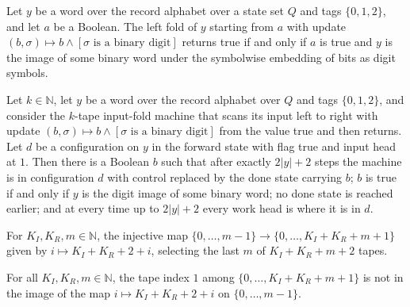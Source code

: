 \begin{lemma}
\label{Complexity.sph_fold_valid}
\leanok
{}
Let $y$ be a word over the record alphabet over a state set $Q$ and tags $\{0,1,2\}$, and let
$a$ be a Boolean. The left fold of $y$ starting from $a$ with update
$(b,\sigma)\mapsto b\wedge[\sigma\text{ is a binary digit}]$ returns true if and only if $a$ is true
and $y$ is the image of some binary word under the symbolwise embedding of bits as digit symbols.
\end{lemma}

\begin{lemma}
\label{Complexity.sph_validation_run}
\leanok
{}
Let $k\in\mathbb{N}$, let $y$ be a word over the record alphabet over $Q$ and tags $\{0,1,2\}$, and
consider the $k$-tape input-fold machine that scans its input left to right with update
$(b,\sigma)\mapsto b\wedge[\sigma\text{ is a binary digit}]$ from the value true and then returns.
Let $d$ be a configuration on $y$ in the forward state with flag true and input head at $1$. Then
there is a Boolean $b$ such that after exactly $2|y|+2$ steps the machine is in configuration $d$
with control replaced by the done state carrying $b$; $b$ is true if and only if $y$ is the
digit image of some binary word; no done state is reached earlier; and at every time up to
$2|y|+2$ every work head is where it is in $d$.
\end{lemma}

\begin{definition}
\label{Complexity.sphWitnessSel}
\leanok
For $K_I,K_R,m\in\mathbb{N}$, the injective map $\{0,\dots,m-1\}\to\{0,\dots,K_I+K_R+m+1\}$ given by
$i\mapsto K_I+K_R+2+i$, selecting the last $m$ of $K_I+K_R+m+2$ tapes.
\end{definition}

\begin{lemma}
\label{Complexity.sph_witness_cap}
\leanok
{}
For all $K_I,K_R,m\in\mathbb{N}$, the tape index $1$ among $\{0,\dots,K_I+K_R+m+1\}$ is not in the image
of the map $i\mapsto K_I+K_R+2+i$ on $\{0,\dots,m-1\}$.
\end{lemma}

